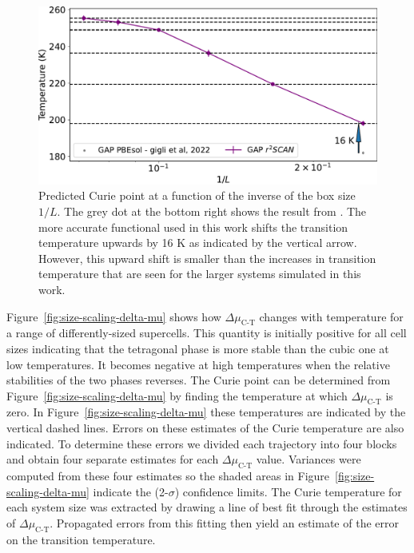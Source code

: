 \begin{figure}
    \centering
    \includegraphics[width=0.8\linewidth]{fig/Size-scaling-Temp.pdf}
    \caption{Predicted Curie point at a function of the inverse of the box size $1/L$.  The grey dot at the bottom right shows the result from \cite{gigli_thermodynamics_2022}. The more accurate functional used in this work shifts the transition temperature upwards by 16 K as indicated by the vertical arrow. However, this upward shift is smaller than the increases in transition temperature that are seen for the larger systems simulated in this work.}
    \label{fig:size-scaling-temp}
\end{figure}

Figure~\ref{fig:size-scaling-delta-mu} shows how $\Delta\mu_{\textrm{C-T}}$ changes with temperature for a range of differently-sized supercells.  This quantity is initially positive for all cell sizes indicating that the tetragonal phase is more stable than the cubic one at low temperatures.  It becomes negative at high temperatures when the relative stabilities of the two phases reverses.  The Curie point can be determined from Figure~\ref{fig:size-scaling-delta-mu} by finding the temperature at which $\Delta\mu_{\textrm{C-T}}$ is zero.  In Figure~\ref{fig:size-scaling-delta-mu} these temperatures are indicated by the vertical dashed lines.  Errors on these estimates of the Curie temperature are also indicated. To determine these errors we divided each trajectory into four blocks and obtain four separate estimates for each $\Delta\mu_{\textrm{C-T}}$ value.  Variances were computed from these four estimates so the shaded areas in Figure~\ref{fig:size-scaling-delta-mu} indicate the (2-$\sigma$) confidence limits.  The Curie temperature for each system size was extracted by drawing a line of best fit through the estimates of    $\Delta\mu_{\textrm{C-T}}$.  Propagated errors from this fitting then yield an estimate of the error on the transition temperature.

